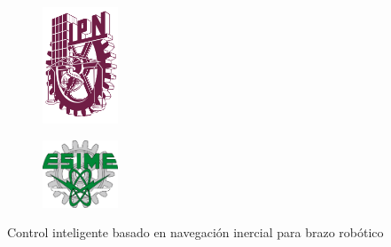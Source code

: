 \documentclass[12pt]{memoir}
\begin{document}
\thispagestyle{empty}

\begin{figure}[h]
    \includegraphics[width=0.2\textwidth]{recursos/logo-ipn-guinda.png}
    \hspace{-\textwidth} %
    \vspace{-\topskip}   %
\end{figure}

\begin{figure}[b]
\includegraphics[width=0.2\textwidth]{recursos/esime.png}
\end{figure} 


\begin{center}
Control inteligente basado en navegación inercial para brazo robótico
\end{center}
\end{document}
